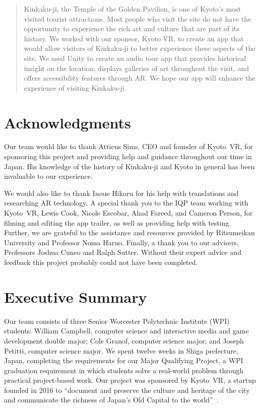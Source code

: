 \documentclass[a4paper, 10pt, american, titlepage]{article}
\begin{document}
\begin{abstract}
Kinkaku-ji, the Temple of the Golden Pavilion, is one of Kyoto's most visited
tourist attractions. Most people who visit the site do not have the opportunity
to experience the rich art and culture that are part of its history. We worked
with our sponsor, Kyoto VR, to create an app that would allow visitors of 
Kinkaku-ji to better experience these aspects of the site. We used Unity to
create an audio tour app that provides historical insight on the location, 
displays galleries of art throughout the visit, and offers accessibility 
features through AR. We hope our app will enhance the experience of visiting
Kinkaku-ji.  
\end{abstract}

\section*{Acknowledgments}
\label{sec:acknowledgements}

Our team would like to thank Atticus Sims, CEO and founder of Kyoto~VR, for
sponsoring this project and providing help and guidance throughout our time in
Japan. His knowledge of the history of Kinkaku-ji and Kyoto in general has been
invaluable to our experience.

We would also like to thank Inoue Hikaru for his help with translations and
researching AR technology. A special thank you to the IQP team working with
Kyoto~VR, Lewis Cook, Nicole Escobar, Ahad Fareed, and Cameron Person, for
filming and editing the app trailer, as well as providing help with testing.
Further, we are grateful to the assistance and resources provided by Ritsumeikan
University and Professor Noma Haruo. Finally, a thank you to our advisers,
Professors Joshua Cuneo and Ralph Sutter. Without their expert advice and
feedback this project probably could not have been completed.

\clearpage

\section*{Executive Summary}
\label{sec:executiveSummary}

Our team consists of three Senior Worcester Polytechnic Institute (WPI)
students: William Campbell, computer science and interactive media and game
development double major; Cole Granof, computer science major; and Joseph
Petitti, computer science major. We spent twelve weeks in Shiga prefecture, Japan,
completing the requirements for our Major Qualifying Project, a WPI graduation
requirement in which students solve a real-world problem through practical
project-based work. Our project was sponsored by Kyoto~VR, a startup founded in
2016 to ``document and preserve the culture and heritage of the city and
communicate the richness of Japan’s Old Capital to the
world''~\autocite{kyotovr2018}.
\end{document}
